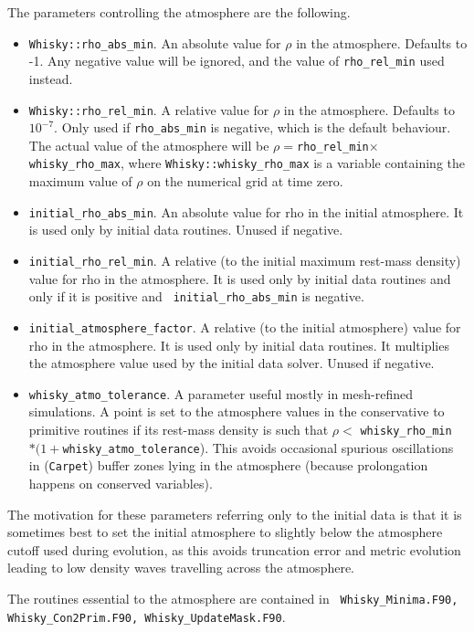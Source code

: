 \documentclass{article}
\begin{document}
The parameters controlling the atmosphere are the following.
\begin{itemize}
\item {\tt Whisky::rho\_abs\_min}. An absolute value for $\rho$ in the
  atmosphere. Defaults to -1. Any negative value will be ignored, and
  the value of {\tt rho\_rel\_min} used instead.
\item {\tt Whisky::rho\_rel\_min}. A relative value for $\rho$ in the
  atmosphere. Defaults to $10^{-7}$. Only used if {\tt rho\_abs\_min}
  is negative, which is the default behaviour. The actual value of the
  atmosphere will be $\rho =${\tt rho\_rel\_min}$\times${\tt
    whisky\_rho\_max}, where {\tt Whisky::whisky\_rho\_max}
  is a variable containing the maximum value of $\rho$ on the numerical grid at time zero.
\item {\tt initial\_rho\_abs\_min}. An absolute value for rho in the initial atmosphere. It is used
  only by initial data routines. Unused if negative.
\item {\tt initial\_rho\_rel\_min}. A relative (to the initial maximum rest-mass density) value for rho
  in the atmosphere. It is used only by initial data routines and only if it is positive and {\tt
  initial\_rho\_abs\_min} is negative.
\item {\tt initial\_atmosphere\_factor}. A relative (to the initial atmosphere) value for rho in the
  atmosphere. It is used only by initial data routines. It multiplies the atmosphere value used by
  the initial data solver. Unused if negative.
\item {\tt whisky\_atmo\_tolerance}. A parameter useful mostly in mesh-refined simulations. A point
  is set to the atmosphere values in the conservative to primitive routines if its rest-mass density
  is such that $\rho <$ {\tt whisky\_rho\_min}$*(1+${\tt whisky\_atmo\_tolerance}). This avoids
  occasional spurious oscillations in ({\tt Carpet}) buffer zones lying in the atmosphere (because
  prolongation happens on conserved variables).
\end{itemize}

The motivation for these parameters referring only to the initial data is that it is sometimes best
to set the initial atmosphere to slightly below the atmosphere cutoff used during evolution, as this
avoids truncation error and metric evolution leading to low density waves travelling across the
atmosphere.

The routines essential to the atmosphere are contained in {\tt
Whisky\_Minima.F90, Whisky\_Con2Prim.F90, Whisky\_UpdateMask.F90}. 
\end{document}

